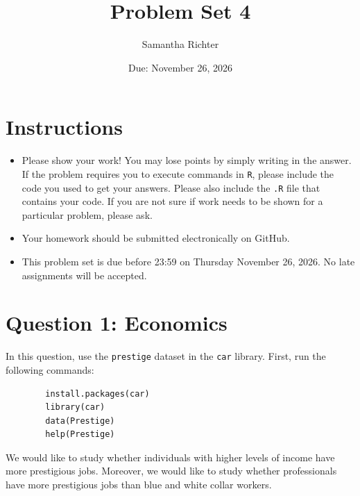 \documentclass[12pt,letterpaper]{article}
\title{Problem Set 4}
\date{Due: November 26, 2026}
\author{Samantha Richter}
\begin{document}
	\maketitle
	\section*{Instructions}
	\begin{itemize}
		\item Please show your work! You may lose points by simply writing in the answer. If the problem requires you to execute commands in \texttt{R}, please include the code you used to get your answers. Please also include the \texttt{.R} file that contains your code. If you are not sure if work needs to be shown for a particular problem, please ask.
		\item Your homework should be submitted electronically on GitHub.
		\item This problem set is due before 23:59 on Thursday November 26, 2026. No late assignments will be accepted.
	\end{itemize}
	
	
	
	\vspace{.5cm}
	\section*{Question 1: Economics}
	\vspace{.25cm}
	\noindent 	
	In this question, use the \texttt{prestige} dataset in the \texttt{car} library. First, run the following commands:
	
	\begin{verbatim}
		install.packages(car)
		library(car)
		data(Prestige)
		help(Prestige)
	\end{verbatim} 
	
	
	\noindent We would like to study whether individuals with higher levels of income have more prestigious jobs. Moreover, we would like to study whether professionals have more prestigious jobs than blue and white collar workers.
	
\end{document}
